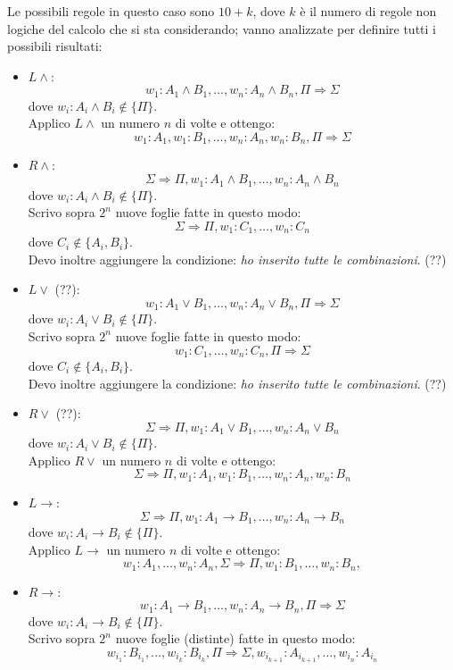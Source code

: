 \documentclass[a4paper,12pt]{article}
\newcommand{\latinmath}[1]{\text{\latinmodern{#1}}} %
\newcommand{\To}{\Rightarrow} %
\begin{document}
\begin{defin}
\begin{description}
\begin{enumerate}
			Le possibili regole in questo caso sono $10+k$, dove $k$ è il numero di regole non logiche del calcolo \latinmath{G3L} che si sta considerando; vanno analizzate per definire tutti i possibili risultati:
			\begin{itemize}
				\item $L\land$: $$w_1 : A_1 \land B_1, \ldots, w_n : A_n \land B_n, \Pi \To \Sigma$$
				dove $w_i : A_i \land B_i \notin \{\Pi\}$. \\
				Applico $L\land$ un numero $n$ di volte e ottengo:
				$$w_1 : A_1, w_1 : B_1, \ldots, w_n : A_n, w_n : B_n, \Pi \To \Sigma$$
				\item $R\land$: $$\Sigma \To \Pi, w_1 : A_1 \land B_1, \ldots, w_n : A_n \land B_n$$
				dove $w_i : A_i \land B_i \notin \{\Pi\}$. \\
				Scrivo sopra $2^n$ nuove foglie fatte in questo modo:
				$$\Sigma \To \Pi, w_1 : C_1, \ldots, w_n : C_n$$
				dove $C_i \notin \{A_i, B_i\}$. \\
				Devo inoltre aggiungere la condizione: \emph{ho inserito tutte le combinazioni}. (??)
				\item $L\lor$ (??): $$w_1 : A_1 \lor B_1, \ldots, w_n : A_n \lor B_n, \Pi \To \Sigma$$
				dove $w_i : A_i \lor B_i \notin \{\Pi\}$. \\
				Scrivo sopra $2^n$ nuove foglie fatte in questo modo:
				$$w_1 : C_1, \ldots, w_n : C_n, \Pi \To \Sigma$$
				dove $C_i \notin \{A_i, B_i\}$. \\
				Devo inoltre aggiungere la condizione: \emph{ho inserito tutte le combinazioni}. (??)
				\item $R\lor$ (??): $$\Sigma \To \Pi, w_1 : A_1 \lor B_1, \ldots, w_n : A_n \lor B_n$$
				dove $w_i : A_i \lor B_i \notin \{\Pi\}$. \\
				Applico $R\lor$ un numero $n$ di volte e ottengo:
				$$\Sigma \To \Pi, w_1 : A_1, w_1 : B_1, \ldots, w_n : A_n, w_n : B_n$$
				\item $L\to$: $$\Sigma \To \Pi, w_1 : A_1 \to B_1, \ldots, w_n : A_n \to B_n$$
				dove $w_i : A_i \to B_i \notin \{\Pi\}$. \\
				Applico $L\to$ un numero $n$ di volte e ottengo:
				$$w_1 : A_1, \ldots, w_n : A_n, \Sigma \To \Pi, w_1 : B_1, \ldots, w_n : B_n,$$
				\item $R\to$: $$w_1 : A_1 \to B_1, \ldots, w_n : A_n \to B_n, \Pi \To \Sigma$$
				dove $w_i : A_i \to B_i \notin \{\Pi\}$. \\
				Scrivo sopra $2^n$ nuove foglie (distinte) fatte in questo modo:
				$$w_{i_{1}} : B_{i_{1}}, \ldots, w_{i_{k}} : B_{i_{k}}, \Pi \To \Sigma, w_{i_{k+1}} : A_{i_{k+1}}, \ldots, w_{i_{n}} : A_{i_{n}}$$

\end{itemize}
\end{enumerate}
\end{description}
\end{defin}
\end{document}
